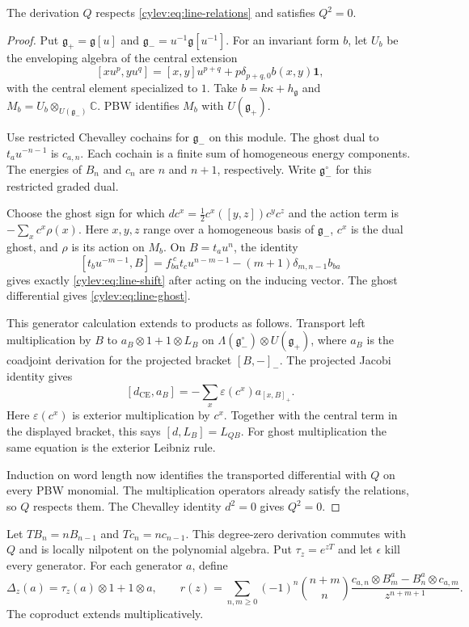 \begin{proposition}\label{cylev:prop:line-dg}
The derivation $Q$ respects \eqref{cylev:eq:line-relations} and
satisfies $Q^2=0$.
\end{proposition}
\begin{proof}
Put $\mathfrak g_+=\mathfrak g[u]$ and
$\mathfrak g_-=u^{-1}\mathfrak g[u^{-1}]$.
For an invariant form $b$, let $U_b$ be the enveloping algebra of
the central extension
\[
 [xu^p,yu^q]=[x,y]u^{p+q}+p\delta_{p+q,0}b(x,y)\mathbf1,
\]
with the central element specialized to $1$.
Take $b=k\kappa+h_{\mathfrak g}$ and
$M_b=U_b\otimes_{U(\mathfrak g_-)}\mathbb C$.
PBW identifies $M_b$ with $U(\mathfrak g_+)$.

Use restricted Chevalley cochains for $\mathfrak g_-$ on this module.
The ghost dual to $t_au^{-n-1}$ is $c_{a,n}$.
Each cochain is a finite sum of homogeneous energy components.
The energies of $B_n$ and $c_n$ are $n$ and $n+1$, respectively.
Write $\mathfrak g_-^\circ$ for this restricted graded dual.

Choose the ghost sign for which
$dc^x=\frac12c^x([y,z])c^yc^z$ and the action term is
$-\sum_x c^x\rho(x)$.
Here $x,y,z$ range over a homogeneous basis of $\mathfrak g_-$,
$c^x$ is the dual ghost, and $\rho$ is its action on $M_b$.
On $B=t_au^n$, the identity
\[
 [t_bu^{-m-1},B]
 =f_{ba}^{\ c}t_cu^{n-m-1}
       -(m+1)\delta_{m,n-1}b_{ba}
\]
gives exactly \eqref{cylev:eq:line-shift} after acting on the inducing
vector. The ghost differential gives \eqref{cylev:eq:line-ghost}.

This generator calculation extends to products as follows.
Transport left multiplication by $B$ to
$a_B\otimes1+1\otimes L_B$ on
$\Lambda(\mathfrak g_-^\circ)\otimes U(\mathfrak g_+)$, where $a_B$
is the coadjoint derivation for the projected bracket $[B,-]_-$.
The projected Jacobi identity gives
\[
 [d_{\mathrm{CE}},a_B]
       =-\sum_x\varepsilon(c^x)a_{[x,B]_+}.
\]
Here $\varepsilon(c^x)$ is exterior multiplication by $c^x$.
Together with the central term in the displayed bracket, this says
$[d,L_B]=L_{QB}$. For ghost multiplication the same equation is
the exterior Leibniz rule.

Induction on word length now identifies the transported differential
with $Q$ on every PBW monomial.
The multiplication operators already satisfy the relations, so $Q$
respects them. The Chevalley identity $d^2=0$ gives $Q^2=0$.
\end{proof}

Let $T B_n=nB_{n-1}$ and $T c_n=nc_{n-1}$.
This degree-zero derivation commutes with $Q$ and is locally
nilpotent on the polynomial algebra.
Put $\tau_z=e^{zT}$ and let $\epsilon$ kill every generator.
For each generator $a$, define
\begin{equation}\label{cylev:eq:line-spectral}
 \Delta_z(a)=\tau_z(a)\otimes1+1\otimes a,\qquad
 r(z)=\sum_{n,m\ge0}(-1)^n\binom{n+m}{n}
       \frac{c_{a,n}\otimes B^a_m-B^a_n\otimes c_{a,m}}{z^{n+m+1}}.
\end{equation}
The coproduct extends multiplicatively.

